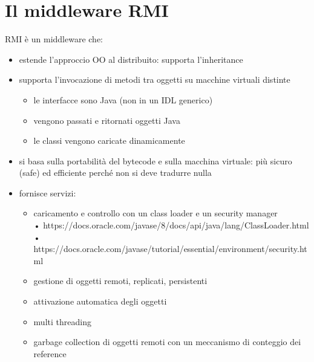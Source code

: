 \section{Il middleware RMI}
RMI è un middleware che:
\begin{itemize}
    \item estende l'approccio OO al distribuito: supporta l'inheritance
    \item supporta l'invocazione di metodi tra oggetti su macchine virtuali distinte
    \begin{itemize}
        \item le interfacce sono Java (non in un IDL generico)
        \item vengono passati e ritornati oggetti Java
        \item le classi vengono caricate dinamicamente
    \end{itemize}
    \item si basa sulla portabilità del bytecode e sulla macchina virtuale: più sicuro (safe) ed efficiente perché non si deve tradurre nulla
    \item fornisce servizi:
    \begin{itemize}
        \item caricamento e controllo con un class loader e un security manager
        \\• https://docs.oracle.com/javase/8/docs/api/java/lang/ClassLoader.html
        \\• https://docs.oracle.com/javase/tutorial/essential/environment/security.html
        \item gestione di oggetti remoti, replicati, persistenti
        \item attivazione automatica degli oggetti
        \item multi threading
        \item garbage collection di oggetti remoti con un meccanismo di conteggio dei reference
    \end{itemize}
\end{itemize}

